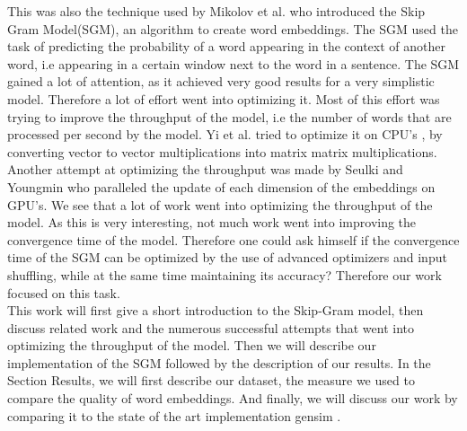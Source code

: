 This was also the technique used by Mikolov et al. \cite{mikolov} who introduced the Skip Gram Model(SGM), an algorithm to create word embeddings. The SGM used the task of predicting the probability of a word appearing in the context of another word, i.e appearing in a certain window next to the word in a sentence. The SGM gained a lot of attention, as it achieved very good results for a very simplistic model. Therefore a lot of effort went into optimizing it. Most of this effort was trying to improve the throughput of the model, i.e the number of words that are processed per second by the model.  Yi et al. tried to optimize it on CPU's \cite{intel}, by converting vector to vector multiplications into matrix matrix multiplications. Another attempt at optimizing the throughput was made by Seulki and Youngmin \cite{gpu} who paralleled the update of each dimension of the embeddings on GPU's. We see that a lot of work went into optimizing the throughput of the model. As this is very interesting, not much work went into improving the convergence time of the model. Therefore one could ask himself if the convergence time of the SGM can be optimized by the use of advanced optimizers and input shuffling, while at the same time maintaining its accuracy?  Therefore our work focused on this task.\\

This work will first give a short introduction to the Skip-Gram model, then discuss related work and the numerous successful attempts that went into optimizing the throughput of the model. Then we will describe our implementation of the SGM followed by the description of our results. In the Section Results, we will first describe our dataset, the measure we used to compare the quality of word embeddings. And finally, we will discuss our work by comparing it to the state of the art implementation gensim \cite{gensim}. 















